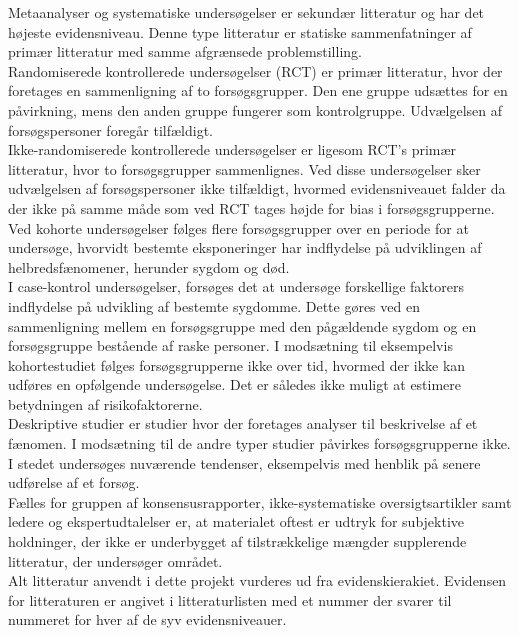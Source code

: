 Metaanalyser og systematiske undersøgelser er sekundær litteratur og har det højeste evidensniveau. Denne type litteratur er statiske sammenfatninger af primær litteratur med samme afgrænsede problemstilling. \citep{denstoredanske2009} \\
Randomiserede kontrollerede undersøgelser (RCT) er primær litteratur, hvor der foretages en sammenligning af to forsøgsgrupper. Den ene gruppe udsættes for en påvirkning, mens den anden gruppe fungerer som kontrolgruppe. Udvælgelsen af forsøgspersoner foregår tilfældigt. \citep{denstoredanske2009a} \\
Ikke-randomiserede kontrollerede undersøgelser er ligesom RCT’s primær litteratur, hvor to forsøgsgrupper sammenlignes. Ved disse undersøgelser sker udvælgelsen af forsøgspersoner ikke tilfældigt, hvormed evidensniveauet falder da der ikke på samme måde som ved RCT tages højde for bias i forsøgsgrupperne. \citep{denstoredanske2009a} \\
Ved kohorte undersøgelser følges flere forsøgsgrupper over en periode for at undersøge, hvorvidt bestemte eksponeringer har indflydelse på udviklingen af helbredsfænomener, herunder sygdom og død. \citep{metodehaandbogen} \\
I case-kontrol undersøgelser, forsøges det at undersøge forskellige faktorers indflydelse på udvikling af bestemte sygdomme. Dette gøres ved en sammenligning mellem en forsøgsgruppe med den pågældende sygdom og en forsøgsgruppe bestående af raske personer. I modsætning til eksempelvis kohortestudiet følges forsøgsgrupperne ikke over tid, hvormed der ikke kan udføres en opfølgende undersøgelse. Det er således ikke muligt at estimere betydningen af  risikofaktorerne. \citep{denstoredanske2012} \\
Deskriptive studier er studier hvor der foretages analyser til beskrivelse af et fænomen. I modsætning til de andre typer studier påvirkes forsøgsgrupperne ikke. I stedet undersøges nuværende tendenser, eksempelvis med henblik på senere udførelse af et forsøg. \citep{} \\
Fælles for gruppen af konsensusrapporter, ikke-systematiske oversigtsartikler samt ledere og ekspertudtalelser er, at materialet oftest er udtryk for subjektive holdninger, der ikke er underbygget af tilstrækkelige mængder supplerende litteratur, der undersøger området. \citep{metodehaandbogen} \\
Alt litteratur anvendt i dette projekt vurderes ud fra evidenskierakiet. Evidensen for litteraturen er angivet i litteraturlisten med et nummer der svarer til nummeret for hver af de syv evidensniveauer.   